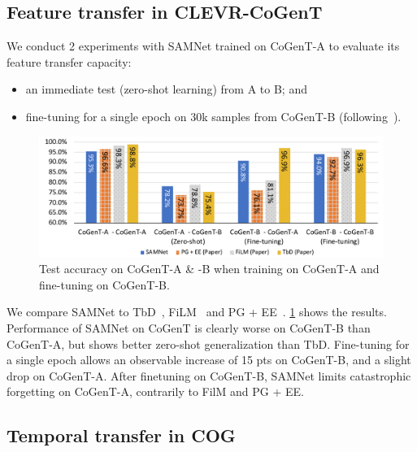 \subsection{Feature transfer in CLEVR-CoGenT}
\label{sec:feature}


We conduct 2 experiments with SAMNet trained on CoGenT-A to evaluate its feature transfer capacity:
\begin{itemize}
\compresslist
\item an immediate test (zero-shot learning) from A to B; and
\item fine-tuning for a single epoch on 30k samples from CoGenT-B (following~\cite{johnson2017inferring, mascharka2018transparency, perez2018film, marois2018transfer}).
\end{itemize}

\begin{figure}[htbp]
	\centering
	\includegraphics[width=\columnwidth]{../results/CoGenT_B_results_with_baselines.pdf}
	\caption{Test accuracy on CoGenT-A \& -B when training on CoGenT-A and fine-tuning on CoGenT-B.}
	\label{fig:CoGenT-B-results}
\end{figure}

We compare SAMNet to TbD~\cite{mascharka2018transparency}, FiLM~\cite{perez2018film} and PG + EE~\cite{johnson2017inferring}. \cref{fig:CoGenT-B-results} shows the results. Performance of SAMNet on CoGenT is clearly worse on CoGenT-B than CoGenT-A, but shows better zero-shot generalization than TbD. Fine-tuning for a single epoch allows an observable increase of 15 pts on CoGenT-B, and a slight drop on CoGenT-A. After finetuning on CoGenT-B, SAMNet limits catastrophic forgetting on CoGenT-A, contrarily to FilM and PG + EE.

\subsection{Temporal transfer in COG}
\label{sec:temporal}

